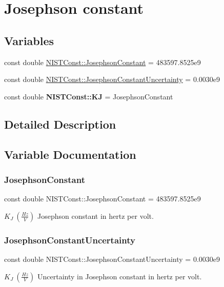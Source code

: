 \hypertarget{group___josephson_constant}{}\section{Josephson constant}
\label{group___josephson_constant}
\subsection*{Variables}
\begin{DoxyCompactItemize}
\item 
const double \hyperlink{group___josephson_constant_gae9f3553a6a6c5eed3df61ad33277cab8}{N\+I\+S\+T\+Const\+::\+Josephson\+Constant} = 483597.\+8525e9
\item 
const double \hyperlink{group___josephson_constant_gaa10eadf7c1811f94c5b5725ad300a099}{N\+I\+S\+T\+Const\+::\+Josephson\+Constant\+Uncertainty} = 0.\+0030e9
\item 
\mbox{\label{group___josephson_constant_ga75e8a1fd7b1434083e96c2f0291eb756}} 
const double {\bfseries N\+I\+S\+T\+Const\+::\+KJ} = Josephson\+Constant
\end{DoxyCompactItemize}


\subsection{Detailed Description}


\subsection{Variable Documentation}
\mbox{\label{group___josephson_constant_gae9f3553a6a6c5eed3df61ad33277cab8}} 
\subsubsection{\texorpdfstring{Josephson\+Constant}{JosephsonConstant}}
{\footnotesize\ttfamily const double N\+I\+S\+T\+Const\+::\+Josephson\+Constant = 483597.\+8525e9}

$K_J \ (\frac{Hz}{V})$ Josephson constant in hertz per volt. \mbox{\label{group___josephson_constant_gaa10eadf7c1811f94c5b5725ad300a099}} 
\subsubsection{\texorpdfstring{Josephson\+Constant\+Uncertainty}{JosephsonConstantUncertainty}}
{\footnotesize\ttfamily const double N\+I\+S\+T\+Const\+::\+Josephson\+Constant\+Uncertainty = 0.\+0030e9}

$K_J \ (\frac{Hz}{V})$ Uncertainty in Josephson constant in hertz per volt. 